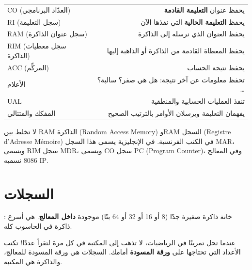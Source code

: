 \begin{center}
\small
\begin{tabularx}{\linewidth}{|>{\centering\arraybackslash}p{2.8cm}|R|}
    \hline
     &  \\ \hline
    \textenglish{CO} (العدّاد البرنامجي) & يحفظ عنوان \textbf{التعليمة القادمة} \\ \hline
    \textenglish{RI} (سجل التعليمة) & يحفظ \textbf{التعليمة الحالية} التي نفذها الآن \\ \hline
    \textenglish{RAM} (سجل عنوان الذاكرة) & يحفظ العنوان الذي نرسله إلى الذاكرة \\ \hline
    \textenglish{RIM} (سجل معطيات الذاكرة) & يحفظ المعطاة القادمة من الذاكرة أو الذاهبة إليها \\ \hline
    \textenglish{ACC} (المركِّم) & يحفظ نتيجة الحساب \\ \hline
    الأعلام & تحفظ معلومات عن آخر نتيجة: هل هي صفر؟ سالبة؟ \dots \\ \hline
    \textenglish{UAL} & تنفذ العمليات الحسابية والمنطقية \\ \hline
    المفكك والمتتالي & يفهمان التعليمة ويرسلان الأوامر بالترتيب الصحيح \\ \hline
\end{tabularx}
\end{center}

\begin{intabih}
    لا تخلط بين \textenglish{RAM} الذاكرة (\textenglish{Random Access Memory}) و\textenglish{RAM}
    السجل (\textenglish{Registre d'Adresse Mémoire}) في الكتب الفرنسية. في الإنجليزية يسمى هذا
    السجل \textenglish{MAR}، ويسمى \textenglish{RIM} سجل \textenglish{MDR}، ويسمى \textenglish{CO}
    سجل \textenglish{PC} \textenglish{(Program Counter)}، وفي المعالج \textenglish{8086} نسميه \textenglish{IP}.
\end{intabih}

\section{السجلات}

\begin{tarif}
    : خانة ذاكرة صغيرة جدًا (8 أو 16 أو 32 أو 64 بتًا)
    موجودة \textbf{داخل المعالج}. هي أسرع ذاكرة في الحاسوب كله.
\end{tarif}

\begin{tashbih}
    عندما تحل تمرينًا في الرياضيات، لا تذهب إلى المكتبة في كل مرة لتقرأ عددًا! تكتب الأعداد التي
    تحتاجها على \textbf{ورقة المسودة} أمامك. السجلات هي ورقة المسودة للمعالج، والذاكرة هي المكتبة.
\end{tashbih}

